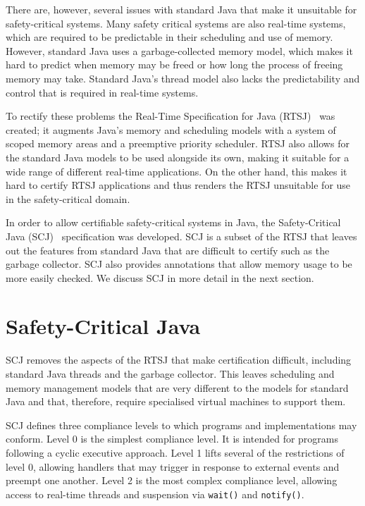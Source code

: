 There are, however, several issues with standard Java that make it
unsuitable for safety-critical systems.
Many safety critical systems are also real-time systems, which are
required to be predictable in their scheduling and use of memory.
However, standard Java uses a garbage-collected memory model, which
makes it hard to predict when memory may be freed or how long the
process of freeing memory may take.
Standard Java's thread model also lacks the predictability and control
that is required in real-time systems.

To rectify these problems the Real-Time Specification for Java
(RTSJ)~\cite{gosling2000} was created; it augments Java's memory and
scheduling models with a system of scoped memory areas and a
preemptive priority scheduler.
RTSJ also allows for the standard Java models to be used alongside its
own, making it suitable for a wide range of different real-time
applications.
On the other hand, this makes it hard to certify RTSJ applications and
thus renders the RTSJ unsuitable for use in the safety-critical
domain.

In order to allow certifiable safety-critical systems in Java, the
Safety-Critical Java (SCJ)~\cite{locke2013} specification was
developed.
SCJ is a subset of the RTSJ that leaves out the features from standard
Java that are difficult to certify such as the garbage collector.
SCJ also provides annotations that allow memory usage to be more
easily checked.
We discuss SCJ in more detail in the next section.

\section{Safety-Critical Java}
\label{scj-section}

SCJ removes the aspects of the RTSJ that make certification difficult,
including standard Java threads and the garbage collector.
This leaves scheduling and memory management models that are very
different to the models for standard Java and that, therefore, require
specialised virtual machines to support them.

SCJ defines three compliance levels to which programs and
implementations may conform.
Level 0 is the simplest compliance level.
It is intended for programs following a cyclic executive approach.
Level 1 lifts several of the restrictions of level 0, allowing
handlers that may trigger in response to external events and preempt
one another.
Level 2 is the most complex compliance level, allowing access to
real-time threads and suspension via \texttt{wait()} and
\texttt{notify()}.  

